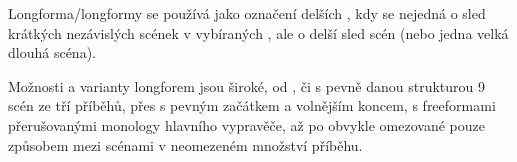 \needspace{5cm} \label{longforma} Longforma/longformy se používá jako označení delších , kdy se nejedná 
o sled krátkých nezávislých scének v  vybíraných ,  
ale o delší sled scén (nebo jedna velká dlouhá scéna). 
 
Možnosti  a varianty longforem jsou široké, od , či  s pevně danou strukturou 9 scén ze tří příběhů, 
přes  s pevným začátkem a volnějším koncem,   s freeformami přerušovanými monology hlavního vypravěče,   
až po  obvykle omezované pouze způsobem  mezi scénami v neomezeném množství příběhu. 
 
 
 
 
